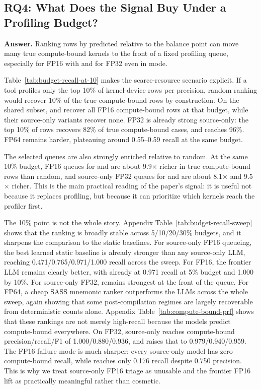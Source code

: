 \subsection{RQ4: What Does the Signal Buy Under a Profiling Budget?}

\textbf{Answer.}
Ranking rows by predicted \rai relative to the balance point can move many true compute-bound kernels to the front of a fixed profiling queue, especially for FP16 with \sourcesass and for FP32 even in \sourceonly mode.



Table~\ref{tab:budget-recall-at-10} makes the scarce-resource scenario explicit.
If a tool profiles only the top 10\% of kernel-device rows per precision, random ranking would recover 10\% of the true compute-bound rows by construction.
On the shared subset, \sourcesass \gptfivefour and \opus recover all FP16 compute-bound rows at that budget, while their source-only variants recover none.
FP32 is already strong source-only: the top 10\% of \gptfivefour rows recovers 82\% of true compute-bound cases, and \opus reaches 96\%.
FP64 remains harder, plateauing around 0.55--0.59 recall at the same budget.

The selected queues are also strongly enriched relative to random.
At the same 10\% budget, \sourcesass FP16 queues for \gptfivefour and \opus are about 9.9$\times$ richer in true compute-bound rows than random, and source-only FP32 queues for \gptfivefour and \opus are about 8.1$\times$ and 9.5$\times$ richer.
This is the main practical reading of the paper's signal:
it is useful not because it replaces profiling, but because it can prioritize which kernels reach the profiler first.

The 10\% point is not the whole story.
Appendix Table~\ref{tab:budget-recall-sweep} shows that the ranking is broadly stable across 5/10/20/30\% budgets, and it sharpens the comparison to the static baselines.
For source-only FP16 queueing, the best learned static baseline is already stronger than any source-only LLM, reaching 0.471/0.765/0.971/1.000 recall across the sweep.
For \sourcesass FP16, the frontier LLM remains clearly better, with \opus already at 0.971 recall at 5\% budget and 1.000 by 10\%.
For source-only FP32, \opus remains strongest at the front of the queue.
For \sourcesass FP64, a cheap SASS mnemonic ranker outperforms the LLMs across the whole sweep, again showing that some post-compilation regimes are largely recoverable from deterministic counts alone.
Appendix Table~\ref{tab:compute-bound-prf} shows that these rankings are not merely high-recall because the models predict compute-bound everywhere.
On FP32, source-only \opus reaches compute-bound precision/recall/F1 of 1.000/0.880/0.936, and \sourcesass raises that to 0.979/0.940/0.959.
The FP16 failure mode is much sharper:
every source-only model has zero compute-bound recall, while \gptoss \sourcesass reaches only 0.176 recall despite 0.750 precision.
This is why we treat source-only FP16 triage as unusable and the frontier \sourcesass FP16 lift as practically meaningful rather than cosmetic.

